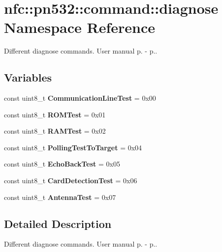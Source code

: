 \hypertarget{namespacenfc_1_1pn532_1_1command_1_1diagnose}{}\section{nfc\+:\+:pn532\+:\+:command\+:\+:diagnose Namespace Reference}
\label{namespacenfc_1_1pn532_1_1command_1_1diagnose}


Different diagnose commands. User manual p. -\/ p..  


\subsection*{Variables}
\begin{DoxyCompactItemize}
\item 
\mbox{\label{namespacenfc_1_1pn532_1_1command_1_1diagnose_adcef5f2e53cd0253c5409128afd9f582}} 
const uint8\+\_\+t {\bfseries Communication\+Line\+Test} = 0x00
\item 
\mbox{\label{namespacenfc_1_1pn532_1_1command_1_1diagnose_a8fc0e27466ac21394a89bece4a5c269c}} 
const uint8\+\_\+t {\bfseries R\+O\+M\+Test} = 0x01
\item 
\mbox{\label{namespacenfc_1_1pn532_1_1command_1_1diagnose_a820f529616ec7d1a770d2ae67608f058}} 
const uint8\+\_\+t {\bfseries R\+A\+M\+Test} = 0x02
\item 
\mbox{\label{namespacenfc_1_1pn532_1_1command_1_1diagnose_a943fc1d5735d01d9c4cdbf120d9e03e6}} 
const uint8\+\_\+t {\bfseries Polling\+Test\+To\+Target} = 0x04
\item 
\mbox{\label{namespacenfc_1_1pn532_1_1command_1_1diagnose_adc10b2352634fdd1207f409ba23ebeb6}} 
const uint8\+\_\+t {\bfseries Echo\+Back\+Test} = 0x05
\item 
\mbox{\label{namespacenfc_1_1pn532_1_1command_1_1diagnose_aa41306a39891ee923961987238a589a9}} 
const uint8\+\_\+t {\bfseries Card\+Detection\+Test} = 0x06
\item 
\mbox{\label{namespacenfc_1_1pn532_1_1command_1_1diagnose_ab8ed4477775b19eea98f06da65c2c52f}} 
const uint8\+\_\+t {\bfseries Antenna\+Test} = 0x07
\end{DoxyCompactItemize}


\subsection{Detailed Description}
Different diagnose commands. User manual p. -\/ p.. 